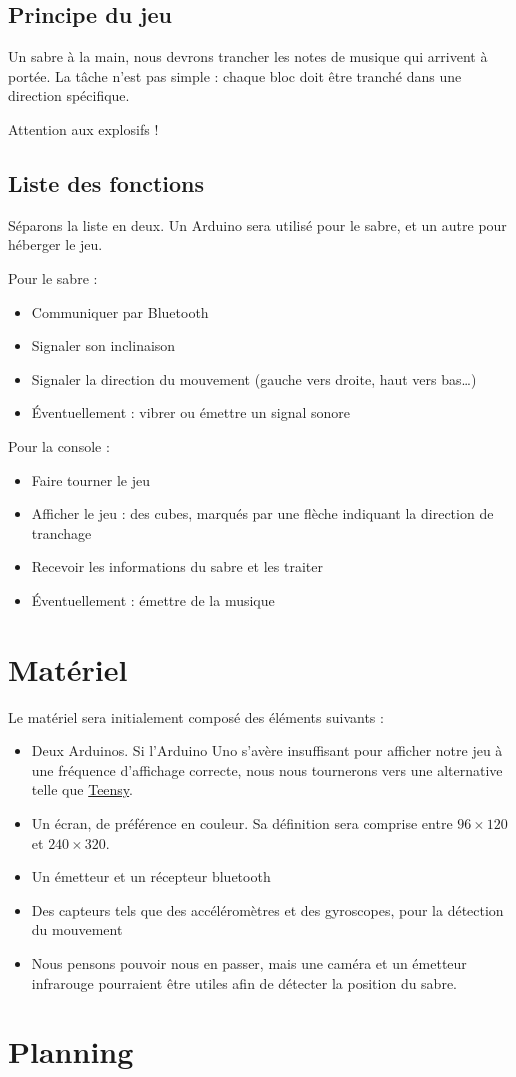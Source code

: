 \documentclass[12pt,twoside]{article}
\begin{document}
\subsection{Principe du jeu}%
\label{sub:principe_du_jeu}

Un sabre à la main, nous devrons trancher les notes de musique qui arrivent à portée. La
tâche n'est pas simple : chaque bloc doit être tranché dans une direction spécifique.

Attention aux explosifs !

\subsection{Liste des fonctions}%
\label{sub:liste_des_fonctions}

Séparons la liste en deux. Un Arduino sera utilisé pour le sabre, et un autre pour
héberger le jeu.

Pour le sabre :
\begin{itemize}
	\item Communiquer par Bluetooth
	\item Signaler son inclinaison
	\item Signaler la direction du mouvement (gauche vers droite, haut vers bas\ldots)
	\item Éventuellement : vibrer ou émettre un signal sonore
\end{itemize}
Pour la console :
\begin{itemize}
	\item Faire tourner le jeu
	\item Afficher le jeu : des cubes, marqués par une flèche indiquant la direction de
		tranchage
	\item Recevoir les informations du sabre et les traiter
	\item Éventuellement : émettre de la musique
\end{itemize}

\section{Matériel}%
\label{sec:materiel}

Le matériel sera initialement composé des éléments suivants :
\begin{itemize}
	\item Deux Arduinos. Si l'Arduino Uno s'avère insuffisant pour afficher notre jeu à
		une fréquence d'affichage correcte, nous nous tournerons vers
		une alternative telle que \href{https://www.pjrc.com/store/teensy40.html}{Teensy}.
	\item Un écran, de préférence en couleur. Sa définition sera comprise entre $96\times
	120$ et $240 \times 320$.
	\item Un émetteur et un récepteur bluetooth
	\item Des capteurs tels que des accéléromètres et des gyroscopes, pour la détection du
		mouvement
	\item Nous pensons pouvoir nous en passer, mais une caméra et un émetteur infrarouge
		pourraient être utiles afin de détecter la position du sabre.
\end{itemize}

\section{Planning}%
\label{sec:planning}
\end{document}
